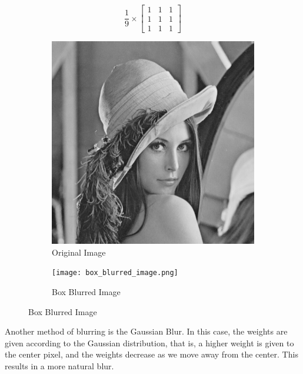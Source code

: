 \documentclass[12pt]{report}
\begin{document}
\begin{equation*}
    \frac{1}{9} \times
    \begin{bmatrix}
        1 & 1 & 1 \\
        1 & 1 & 1 \\
        1 & 1 & 1
    \end{bmatrix}
\end{equation*}

\begin{figure}[H]
    \centering
    \begin{subfigure}{0.4\textwidth}
        \centering
        \includegraphics[width=\linewidth]{Lena.png}
        \caption{Original Image}
    \end{subfigure}
    \begin{subfigure}{0.4\textwidth}
        \centering
        \texttt{[image: box\_blurred\_image.png]}
        \caption{Box Blurred Image}
    \end{subfigure}
\end{figure}

Another method of blurring is the Gaussian Blur. In this case, the weights are given according to the Gaussian distribution, that is, a higher weight is given to the center pixel, and the weights decrease as we move away from the center. This results in a more natural blur.
\end{document}
